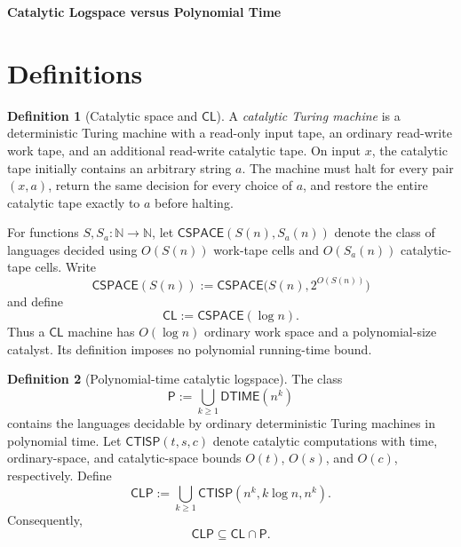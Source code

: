 \documentclass[10pt,a4paper]{article}
\theoremstyle{definition}
\newtheorem*{definition*}{Definition}
\newcommand{\CSPACE}{\mathsf{CSPACE}}
\newcommand{\CTISP}{\mathsf{CTISP}}
\newcommand{\CL}{\mathsf{CL}}
\newcommand{\CLP}{\mathsf{CLP}}
\newcommand{\Pclass}{\mathsf{P}}
\begin{document}
\begin{center}
  {\Large\bfseries Catalytic Logspace versus Polynomial Time}
\end{center}

\section{Definitions}

\begin{definition*}[Catalytic space and $\CL$]
A \emph{catalytic Turing machine} is a deterministic Turing machine with a
read-only input tape, an ordinary read-write work tape, and an additional
read-write catalytic tape. On input $x$, the catalytic tape initially contains
an arbitrary string $a$. The machine must halt for every pair $(x,a)$, return
the same decision for every choice of $a$, and restore the entire catalytic
tape exactly to $a$ before halting.

For functions $S,S_a:\mathbb N\to\mathbb N$, let
$\CSPACE(S(n),S_a(n))$ denote the class of languages decided using $O(S(n))$
work-tape cells and $O(S_a(n))$ catalytic-tape cells. Write
\begin{equation}
  \CSPACE(S(n))
  :=
  \CSPACE\bigl(S(n),2^{O(S(n))}\bigr)
\end{equation}
and define
\begin{equation}
  \CL:=\CSPACE(\log n).
\end{equation}
Thus a $\CL$ machine has $O(\log n)$ ordinary work space and a polynomial-size
catalyst. Its definition imposes no polynomial running-time bound.
\end{definition*}

\begin{definition*}[Polynomial-time catalytic logspace]
The class
\begin{equation}
  \Pclass
  :=
  \bigcup_{k\geq1}\mathsf{DTIME}(n^k)
\end{equation}
contains the languages decidable by ordinary deterministic Turing machines in
polynomial time. Let $\CTISP(t,s,c)$ denote catalytic computations with time,
ordinary-space, and catalytic-space bounds $O(t)$, $O(s)$, and $O(c)$,
respectively. Define
\begin{equation}
  \CLP
  :=
  \bigcup_{k\geq1}\CTISP(n^k,k\log n,n^k).
\end{equation}
Consequently,
\begin{equation}
  \CLP\subseteq\CL\cap\Pclass.
\end{equation}
\end{definition*}
\end{document}
